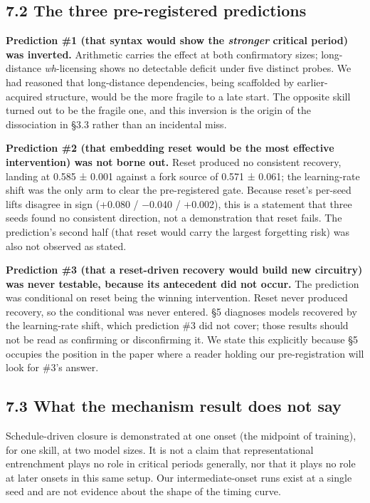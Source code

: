 \documentclass[11pt]{article}
\begin{document}
\subsection{7.2 The three pre-registered predictions}\label{the-three-pre-registered-predictions}

\textbf{Prediction \#1 (that syntax would show the \emph{stronger} critical period) was inverted.}
Arithmetic carries the effect at both confirmatory sizes; long-distance \emph{wh}-licensing shows
no detectable deficit under five distinct probes. We had reasoned that long-distance
dependencies, being scaffolded by earlier-acquired structure, would be the more fragile to a
late start. The opposite skill turned out to be the fragile one, and this inversion is the
origin of the dissociation in §3.3 rather than an incidental miss.

\textbf{Prediction \#2 (that embedding reset would be the most effective intervention) was not
borne out.} Reset produced no consistent recovery, landing at 0.585 ± 0.001 against a fork
source of 0.571 ± 0.061; the learning-rate shift was the only arm to clear the pre-registered
gate. Because reset's per-seed lifts disagree in sign (+0.080 / −0.040 / +0.002), this is a
statement that three seeds found no consistent direction, not a demonstration that reset
fails. The prediction's second half (that reset would carry the largest forgetting risk) was
also not observed as stated.

\textbf{Prediction \#3 (that a reset-driven recovery would build new circuitry) was never
testable, because its antecedent did not occur.} The prediction was conditional on reset
being the winning intervention. Reset never produced recovery, so the conditional was never
entered. §5 diagnoses models recovered by the learning-rate shift, which prediction \#3 did
not cover; those results should not be read as confirming or disconfirming it. We state this
explicitly because §5 occupies the position in the paper where a reader holding our
pre-registration will look for \#3's answer.

\subsection{7.3 What the mechanism result does not say}\label{what-the-mechanism-result-does-not-say}

Schedule-driven closure is demonstrated at one onset (the midpoint of training), for one
skill, at two model sizes. It is not a claim that representational entrenchment plays no role
in critical periods generally, nor that it plays no role at later onsets in this same setup.
Our intermediate-onset runs exist at a single seed and are not evidence about the shape of
the timing curve.
\end{document}
